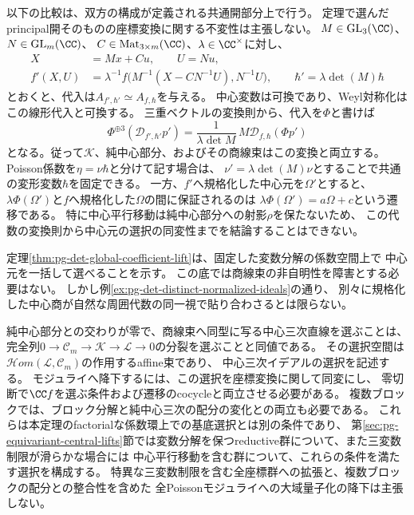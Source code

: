 \begin{remark}[ブロックを保つ座標変換]
\label{rem:pg-det-block-covariance}
以下の比較は、双方の構成が定義される共通開部分上で行う。
定理で選んだprincipal開そのものの座標変換に関する不変性は主張しない。
$M\in\mathrm{GL}_3(\CC)$、$N\in\mathrm{GL}_m(\CC)$、
$C\in\operatorname{Mat}_{3\times m}(\CC)$、$\lambda\in\CC^\times$に対し、
\begin{equation}
 \begin{aligned}
 X&=Mx+Cu,\qquad U=Nu,\\
 f'(X,U)&=\lambda^{-1}
 f\bigl(M^{-1}(X-CN^{-1}U),N^{-1}U\bigr),\qquad
 \hbar'=\lambda\det(M)\hbar
 \end{aligned}
 \label{eq:pg-det-block-coordinate-change}
\end{equation}
とおくと、代入は$A_{f',\hbar'}\simeq A_{f,\hbar}$を与える。
中心変数は可換であり、Weyl対称化はこの線形代入と可換する。
三重ベクトルの変換則から、代入を$\Phi$と書けば
\begin{equation}
 \Phi^{\oplus3}(\mathcal D_{f',\hbar'}p')
 =\frac1{\lambda\det M}\,
 M\mathcal D_{f,\hbar}(\Phi p')
 \label{eq:pg-det-divided-matrix-covariance}
\end{equation}
となる。従って$\mathcal K$、純中心部分、およびその商線束はこの変換と両立する。
Poisson係数を$\eta=\nu\hbar$と分けて記す場合は、
$\nu'=\lambda\det(M)\nu$とすることで共通の変形変数$\hbar$を固定できる。
一方、$f'$へ規格化した中心元を$\Omega'$とすると、
$\lambda\Phi(\Omega')$と$f$へ規格化した$\Omega$の間に保証されるのは
$\lambda\Phi(\Omega')=a\Omega+c$という遷移である。
特に中心平行移動は純中心部分への射影$\rho$を保たないため、
この代数の変換則から中心元の選択の同変性までを結論することはできない。
\end{remark}

\begin{remark}[係数空間上の存在とモジュライへの降下]
\label{rem:pg-det-global-descent-scope}
定理\ref{thm:pg-det-global-coefficient-lift}は、固定した変数分解の係数空間上で
中心元を一括して選べることを示す。
この底では商線束の非自明性を障害とする必要はない。
しかし例\ref{ex:pg-det-distinct-normalized-ideals}の通り、
別々に規格化した中心商が自然な周囲代数の同一視で貼り合わさるとは限らない。

純中心部分との交わりが零で、商線束へ同型に写る中心三次直線を選ぶことは、
完全列$0\to\mathcal C_m\to\mathcal K\to\mathcal L\to0$の分裂を選ぶことと同値である。
その選択空間は$\mathcal Hom(\mathcal L,\mathcal C_m)$の作用するaffine束であり、
中心三次イデアルの選択を記述する。
モジュライへ降下するには、この選択を座標変換に関して同変にし、
零切断で$\CC f$を選ぶ条件および遷移のcocycleと両立させる必要がある。
複数ブロックでは、ブロック分解と純中心三次の配分の変化との両立も必要である。
これらは本定理のfactorialな係数環上での基底選択とは別の条件であり、
第\ref{sec:pg-equivariant-central-lifts}節では変数分解を保つreductive群について、また三変数制限が滑らかな場合には
中心平行移動を含む群について、これらの条件を満たす選択を構成する。
特異な三変数制限を含む全座標群への拡張と、複数ブロックの配分との整合性を含めた
全Poissonモジュライへの大域量子化の降下は主張しない。
\end{remark}

